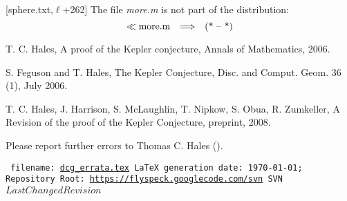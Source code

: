 \documentclass[11pt]{amsart}
\def\svninfo{%
  \begin{small}
  {\tt
  filename: \url{dcg_errata.tex}\hfill\break
  LaTeX generation date: \today; \hfill\break
  Repository Root: \url{https://flyspeck.googlecode.com/svn} \hfill\break
  SVN $LastChangedRevision$
  }
  \end{small}
  }
\def\op#1{{\text{#1}}}
\def\to{{\quad\Longrightarrow\quad}}
\def\line{$\ell$}
\def\text{\hbox}
\begin{document}
[sphere.txt,\line+262]
The file {\it more.m} is not part of the distribution:
	$$\ll \op{more.m} \to \op{(* -- *)}$$



%


\begin{thebibliography}{}

 {T. C. Hales}, A proof of the Kepler
	conjecture, Annals of Mathematics,
	2006.
	
 {S. Feguson and T. Hales},
	The Kepler Conjecture, Disc. and Comput.
	Geom. 36 (1), July 2006.

 {T. C. Hales, J. Harrison, S. McLaughlin, T. Nipkow, S. Obua, R. Zumkeller}, A Revision of the proof of the Kepler Conjecture, preprint, 2008.


\end{thebibliography}

Please report further errors to
Thomas C. Hales ().

\bigskip

\svninfo
\end{document}
